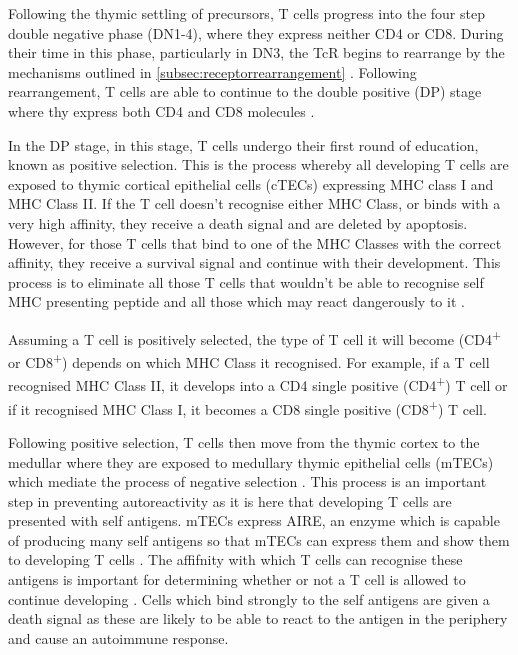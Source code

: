 Following the thymic settling of precursors, T cells progress into the four step double negative phase (DN1-4), where they express neither CD4 or CD8.
During their time in this phase, particularly in DN3, the TcR begins to rearrange by the mechanisms outlined in \cref{subsec:receptorrearrangement} \citep{Starr2003}.
Following rearrangement, T cells are able to continue to the double positive (DP) stage where thy express both CD4 and CD8 molecules \citep{Zuniga1996}.


In the DP stage, in this stage, T cells undergo their first round of education, known as positive selection.
This is the process whereby all developing T cells are exposed to thymic cortical epithelial cells (cTECs) expressing MHC class I and MHC Class II.
If the T cell doesn't recognise either MHC Class, or binds with a very high affinity, they receive a death signal and are deleted by apoptosis.
However, for those T cells that bind to one of the MHC Classes with the correct affinity, they receive a survival signal and continue with their development.
This process is to eliminate all those T cells that wouldn't be able to recognise self MHC presenting peptide and all those which  may react dangerously to it \citep{Jameson1998, Starr2003}.

Assuming a T cell is positively selected, the type of T cell it will become (CD4\textsuperscript{+} or CD8\textsuperscript{+}) depends on which MHC Class it recognised.
For example, if a T cell recognised MHC Class II, it develops into a CD4 single positive (CD4\textsuperscript{+}) T cell or if it recognised MHC Class I, it becomes a CD8 single positive (CD8\textsuperscript{+}) T cell.

Following positive selection, T cells then move from the thymic cortex to the medullar where they are exposed to medullary thymic epithelial cells (mTECs) which mediate the process of negative selection \citep{Starr2003}.
This process is an important step in preventing autoreactivity as it is here that developing T cells are presented with self antigens.
mTECs express AIRE, an enzyme which is capable of producing many self antigens so that mTECs can express them and show them to developing T cells \citep{Anderson2011}.
The affifnity with which T cells can recognise these antigens is important for determining whether or not a T cell is allowed to continue developing \citep{Ashton1994}.
Cells which bind strongly to the self antigens are given a death signal as these are likely to be able to react to the antigen in the periphery and cause an autoimmune response.

